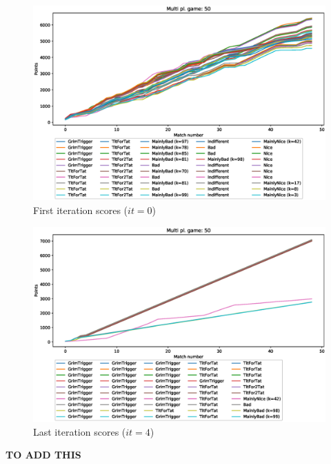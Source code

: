 \documentclass[journal,10pt,twoside]{IEEEtran}
\begin{document}
\begin{figure}[!ht]
    \centering
    \includegraphics[width=1\columnwidth]{../img/ripdmp-const/ripdmp-scores-const-pop-50-r0}
    \caption{First iteration scores ($it=0$)}
    \label{fig:constFI}
\end{figure}

\begin{figure}[!ht]
    \centering
    \includegraphics[width=1\columnwidth]{../img/ripdmp-const/ripdmp-scores-const-pop-50-r3}
    \caption{Last iteration scores ($it=4$)}
    \label{fig:constLI}
\end{figure}

\textbf{TO ADD THIS}
\end{document}
